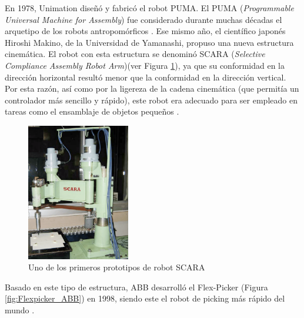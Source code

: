 En 1978, Unimation diseñó y fabricó el robot PUMA. El PUMA (\textit{Programmable Universal Machine for Assembly}) fue considerado durante muchas décadas el arquetipo de los robots antropomórficos \cite{Gasparetto19}. Ese mismo año, el científico japonés Hiroshi Makino, de la Universidad de Yamanashi, propuso una nueva estructura cinemática. El robot con esta estructura se denominó SCARA (\textit{Selective Compliance Assembly Robot Arm})(ver Figura \ref{fig:Scara}), ya que su conformidad en la dirección horizontal resultó menor que la conformidad en la dirección vertical. Por esta razón, así como por la ligereza de la cadena cinemática (que permitía un controlador más sencillo y rápido), este robot era adecuado para ser empleado en tareas como el ensamblaje de objetos pequeños \cite{Makino80}.
  
  \begin{figure} [H]
    \begin{center}
      \includegraphics[width=45mm]{figs/Scara.png}
    \end{center}
    \caption{Uno de los primeros prototipos de robot SCARA}
    \label{fig:Scara}
  \end{figure}
  
Basado en este tipo de estructura, ABB desarrolló el Flex-Picker (Figura \ref{fig:Flexpicker_ABB}) en 1998, siendo este el robot de picking más rápido del mundo \cite{Gasparetto19}.\\
  
